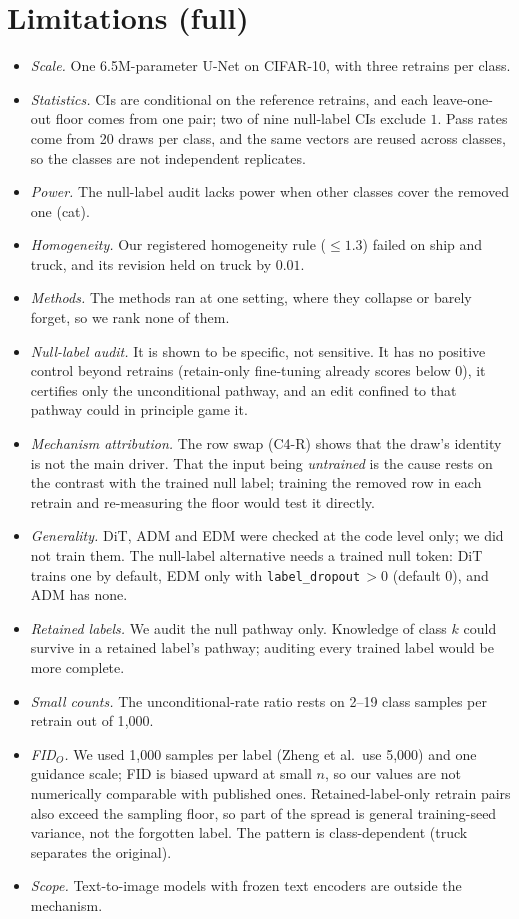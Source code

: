 \documentclass[10pt]{article}
\begin{document}
\section{Limitations (full)}\label{app:limits}
\begin{itemize}
\item \emph{Scale.} One 6.5M-parameter U-Net on CIFAR-10, with three retrains per class.
\item \emph{Statistics.} CIs are conditional on the reference retrains, and each leave-one-out floor comes from one pair; two of nine null-label CIs exclude $1$. Pass rates come from 20 draws per class, and the same vectors are reused across classes, so the classes are not independent replicates.
\item \emph{Power.} The null-label audit lacks power when other classes cover the removed one (cat).
\item \emph{Homogeneity.} Our registered homogeneity rule ($\le1.3$) failed on ship and truck, and its revision held on truck by $0.01$.
\item \emph{Methods.} The methods ran at one setting, where they collapse or barely forget, so we rank none of them.
\item \emph{Null-label audit.} It is shown to be specific, not sensitive. It has no positive control beyond retrains (retain-only fine-tuning already scores below $0$), it certifies only the unconditional pathway, and an edit confined to that pathway could in principle game it.
\item \emph{Mechanism attribution.} The row swap (C4-R) shows that the draw's identity is not the main driver. That the input being \emph{untrained} is the cause rests on the contrast with the trained null label; training the removed row in each retrain and re-measuring the floor would test it directly.
\item \emph{Generality.} DiT, ADM and EDM were checked at the code level only; we did not train them. The null-label alternative needs a trained null token: DiT trains one by default, EDM only with \texttt{label\_dropout}$\,>0$ (default $0$), and ADM has none.
\item \emph{Retained labels.} We audit the null pathway only. Knowledge of class $k$ could survive in a retained label's pathway; auditing every trained label would be more complete.
\item \emph{Small counts.} The unconditional-rate ratio rests on 2--19 class samples per retrain out of 1{,}000.
\item \emph{FID$_O$.} We used 1{,}000 samples per label (Zheng et al.\ use 5{,}000) and one guidance scale; FID is biased upward at small $n$, so our values are not numerically comparable with published ones. Retained-label-only retrain pairs also exceed the sampling floor, so part of the spread is general training-seed variance, not the forgotten label. The pattern is class-dependent (truck separates the original).
\item \emph{Scope.} Text-to-image models with frozen text encoders are outside the mechanism.
\end{itemize}
\end{document}
